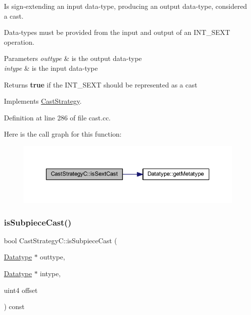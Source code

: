 Is sign-\/extending an input data-\/type, producing an output data-\/type, considered a cast. 

Data-\/types must be provided from the input and output of an I\+N\+T\+\_\+\+S\+E\+XT operation. 
\begin{DoxyParams}{Parameters}
{\em outtype} & is the output data-\/type \\
\hline
{\em intype} & is the input data-\/type \\
\hline
\end{DoxyParams}
\begin{DoxyReturn}{Returns}
{\bfseries{true}} if the I\+N\+T\+\_\+\+S\+E\+XT should be represented as a cast 
\end{DoxyReturn}


Implements \mbox{\hyperlink{class_cast_strategy_a4c42bb2f8be16856a3c6ebbb1771aeaf}{Cast\+Strategy}}.



Definition at line 286 of file cast.\+cc.

Here is the call graph for this function\+:
\nopagebreak
\begin{figure}[H]
\begin{center}
\leavevmode
\includegraphics[width=350pt]{class_cast_strategy_c_a626fa032a6c9ff7ab710f8d28586c72e_cgraph}
\end{center}
\end{figure}
\mbox{\label{class_cast_strategy_c_a24b9433948f1406bfa8503b7d5297415}} 
\subsubsection{\texorpdfstring{isSubpieceCast()}{isSubpieceCast()}}
{\footnotesize\ttfamily bool Cast\+Strategy\+C\+::is\+Subpiece\+Cast (\begin{DoxyParamCaption}\item[{\mbox{\hyperlink{class_datatype}{Datatype}} $\ast$}]{outtype,  }\item[{\mbox{\hyperlink{class_datatype}{Datatype}} $\ast$}]{intype,  }\item[{uint4}]{offset }\end{DoxyParamCaption}) const\hspace{0.3cm}{\ttfamily [virtual]}}



